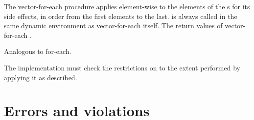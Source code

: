 \begin{entry}{%
}

The {\cf vector-for-each} procedure applies 
element-wise to the elements of the
s for its side effects,  in order from the first elements to the
last.
 is always called in the same dynamic environment 
as {\cf vector-for-each} itself.
The return values of {\cf vector-for-each} \areunspecified.

Analogous to {\cf for-each}.

\implresp The implementation must check the restrictions
on  to the extent performed by applying it as described.
\end{entry}

\section{Errors and violations}
\label{errorviolation}


